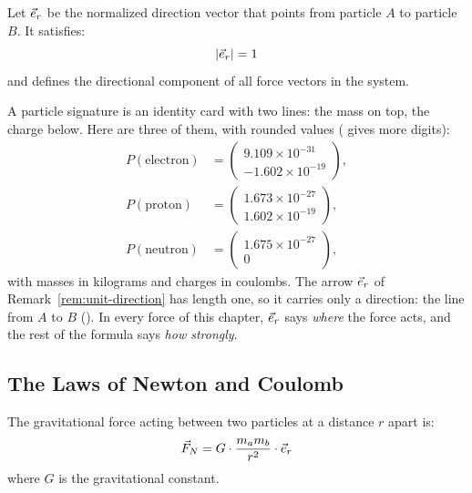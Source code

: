 \begin{remark}\label{rem:unit-direction}
Let $\vec{e}_r$ be the normalized direction vector that points from particle $A$ to particle $B$. It satisfies:
\[
|\vec{e}_r| = 1
\]
and defines the directional component of all force vectors in the system.
\end{remark}

\begin{plainwords}
A particle signature is an identity card with two lines: the mass on top, the charge below. Here are three of them, with rounded values ( gives more digits):
\begin{align*}
P(\text{electron}) &= \begin{pmatrix} 9.109 \times 10^{-31} \\ -1.602 \times 10^{-19} \end{pmatrix}, \\
P(\text{proton}) &= \begin{pmatrix} 1.673 \times 10^{-27} \\ 1.602 \times 10^{-19} \end{pmatrix}, \\
P(\text{neutron}) &= \begin{pmatrix} 1.675 \times 10^{-27} \\ 0 \end{pmatrix},
\end{align*}
with masses in kilograms and charges in coulombs. The arrow $\vec{e}_r$ of Remark~\ref{rem:unit-direction} has length one, so it carries only a direction: the line from $A$ to $B$ (). In every force of this chapter, $\vec{e}_r$ says \emph{where} the force acts, and the rest of the formula says \emph{how strongly}.
\end{plainwords}

\subsection{The Laws of Newton and Coulomb}\label{subsec:classical-forces}

\begin{definition}\label{def:newton}
The gravitational force acting between two particles at a distance $r$ apart is:
\[
\vec{F}_N = G \cdot \frac{m_a m_b}{r^2} \cdot \vec{e}_r
\]
where $G$ is the gravitational constant.
\end{definition}

